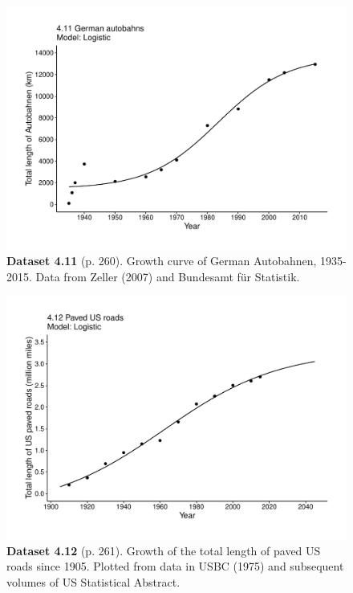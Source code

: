 \documentclass[aps,rmp,preprint,superscriptaddress,10pt,onecolumn]{article}
\begin{document}
\clearpage
\begin{figure}[h]
\includegraphics[width=\textwidth]{output/figs-ggplot/4.11.pdf}
\caption*{\textbf{Dataset 4.11} (p. 260). Growth curve of German Autobahnen, 1935-2015. Data from Zeller (2007) and Bundesamt für Statistik.}
\end{figure}
	
\clearpage
\begin{figure}[h]
\includegraphics[width=\textwidth]{output/figs-ggplot/4.12.pdf}
\caption*{\textbf{Dataset 4.12} (p. 261). Growth of the total length of paved US roads since 1905. Plotted from data in USBC (1975) and subsequent volumes of US Statistical Abstract.}
\end{figure}
	
\end{document}
